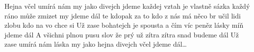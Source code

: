 \begin{TEXT}{Hejna včel}
\SLOKA {} umírá nám  \NL
my jako  divejch  jdeme    
\SLOKA každej vztah je vlastně sázka \NL
každý ráno může zmizet                        my jdeme dál
\REFREN  {}te kdopak za to  \NL
kdo z nás má  něco br \NL
{} učil lidi zlobu  \NL
kdo na vo chce si 
\SLOKA Už zase bohatejch je spousta \NL
a čím víc peněz lásky míň                    jdeme dál
\SLOKA A všichni plnou pusu slov \NL
že prý už zítra zítra snad                    budeme dál
\REFRENHRAJ
\SLOKA Už zase umírá nám láska \NL
my jako hejna divejch včel \NL
jdeme dál…
\end{TEXT}
